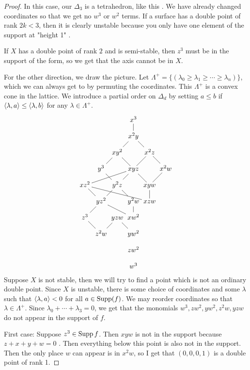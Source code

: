 \begin{proof}
 In this case, our $\Delta_3$ is a tetrahedron, like this . We have already changed coordinates so that we get no $w^3$ or $w^2$ terms. If a surface has a double point of rank $2k<3$, then it is clearly unstable because you only have one element of the support at "height 1" .
 
 If $X$ has a double point of rank $2$ and is semi-stable, then $z^3$ must be in the support of the form, so we get that the axis cannot be in $X$.
 
 For the other direction, we draw the picture. Let $\Lambda^+=\{(\lambda_0\ge \lambda_1\ge\cdots \ge \lambda_n)\}$, which we can always get to by permuting the coordinates. This $\Lambda^+$ is a convex cone in the lattice. We introduce a partial order on $\Delta_d$ by setting $a\le b$ if $\langle\lambda,a\rangle\le \langle\lambda,b\rangle$ for any $\lambda\in \Lambda^+$. 
 \[\xymatrix@!0{
  & & & x^3\ar@{-}[d]\\
  & & & x^2y \ar@{-}[dl]\ar@{-}[dr]\\
  & & xy^2\ar@{-}[dl]\ar@{-}[dr] & & x^2z \ar@{-}[dl]\ar@{-}[dr]\\
  & y^3 \ar@{-}[dr] & & xyz \ar@{-}[dl]\ar@{-}[dr]\ar@{-}[dlll] & & x^2w\ar@{-}[dl]\\
  xz^2\ar@{-}[drrrr]\ar@{-}[dr] & & y^2z\ar@{-}[dl]\ar@{-}[dr] & & xyw \ar@{-}[d]\\
  & yz^2\ar@{-}[dl]\ar@{-}[drr] & & y^2w\ar@{-}[d] & xzw\\
  z^3\ar@{-}[dr] & & yzw\ar@{-}[dl]\ar@{-}[dr] & xw^2\\
  & z^2w & & yw^2\\
  & & & zw^2\\
  & & & w^3
 }\]
 Suppose $X$ is not stable, then we will try to find a point which is not an ordinary double point. Since $X$ is unstable, there is some choice of coordinates and some $\lambda$ such that $\langle\lambda,a\rangle <0$ for all $a\in \operatorname{Supp} (f)$. We may reorder coordinates so that $\lambda\in \Lambda^+$. Since $\lambda_0+\cdots+\lambda_3=0$, we get that the monomials $w^3,zw^2,yw^2,z^2w,yzw$ do not appear in the support of $f$.
 
 First case: Suppose $z^3\in \operatorname{Supp} f$. Then $xyw$ is not in the support because $z+x+y+w=0$ \anton{}. Then everything below this point is also not in the support. Then the only place $w$ can appear is in $x^2w$, so I get that $(0,0,0,1)$ is a double point of rank 1.
 

\end{proof}
